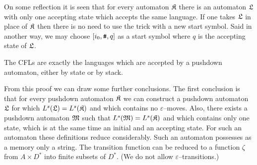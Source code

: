On some reflection it is seen that for every automaton $\mathfrak{K}$ there
is an automaton $\mathfrak{L}$ with only one accepting state which accepts
the same language. If one takes $\mathfrak{L}$ in place of $\mathfrak{K}$ then there
is no need to use the trick with a new start symbol. Said in
another way, we may choose $[i_0, \mbox{\tt \#}, q]$ as a start symbol where
$q$ is the accepting state of $\mathfrak{L}$.
\nocite{chomsky:pushdown}
\begin{thm}[Chomsky]
The CFLs are exactly the languages
which are accepted by a pushdown automaton, either by
state or by stack.
\end{thm}
From this proof we can draw some further conclusions.
The first conclusion is that for every pushdown automaton
$\mathfrak{K}$ we can construct a pushdown automaton $\mathfrak{L}$ for which
$L^s(\mathfrak{L}) = L^s(\mathfrak{K})$ and which contains no $\varepsilon$--moves.
Also, there exists a pushdown automaton $\mathfrak{M}$ such that
$L^s(\mathfrak{M}) = L^s(\mathfrak{K})$ and which contains only one state, which is
at the same time an initial and an accepting state. For such
an automaton these definitions reduce considerably. Such an
automaton possesses as a memory only a string. The transition
function can be reduced to a function $\zeta$ from
$A \times D^{\ast}$ into finite subsets of $D^{\ast}$.
(We do not allow $\varepsilon$--transitions.)

